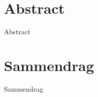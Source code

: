 \par\break\null%
\vsize%
{\centering\section*{Abstract}}

Abstract

\vfill%
{\centering\section*{Sammendrag}}

Sammendrag

\vfill\break%
